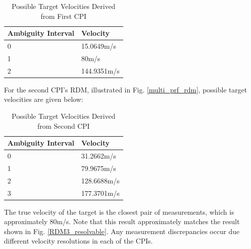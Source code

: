 \documentclass[conference]{IEEEtran}
\begin{document}
\begin{table}[H]
\caption{Possible Target Velocities Derived from First CPI}
\label{Velocity CPI0}
\begin{tabularx}{0.5\textwidth}{| X | X |}
\hline
Ambiguity Interval & Velocity \\
\hline
0 & 15.0649m/s \\
\hline
1 & 80m/s \\
\hline
2 & 144.9351m/s \\
\hline
\end{tabularx}
\end{table}
\noindent
For the second CPI's RDM, illustrated in Fig. \ref{multi_prf_rdm}, possible target velocities are given below:
\begin{table}[H]
\caption{Possible Target Velocities Derived from Second CPI}
\label{Velocity CPI1}
\begin{tabularx}{0.5\textwidth}{| X | X |}
\hline
Ambiguity Interval & Velocity \\
\hline
0 & 31.2662m/s \\
\hline
1 & 79.9675m/s \\
\hline
2 & 128.6688m/s \\
\hline
3 & 177.3701m/s \\
\hline
\end{tabularx}
\end{table}
\noindent
The true velocity of the target is the closest pair of measurements, which is approximately 80m/s. Note that this result approximately matches the result shown in Fig. \ref{RDM3_resolvable}. Any measurement discrepancies occur due different velocity resolutions in each of the CPIs.
\end{document}
